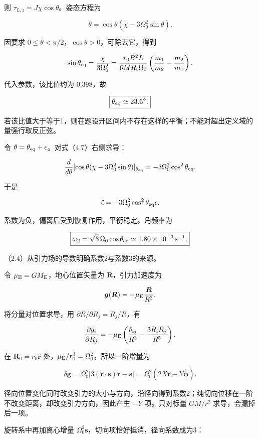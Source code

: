 \documentclass[12pt,a4paper,fontset=fandol]{ctexart}
\begin{document}
则 \(\tau_{L,z}=J\chi\cos\theta\)。姿态方程为

\[
\ddot\theta=\cos\theta(\chi-3\Omega_0^2\sin\theta).
\tag{4.7}
\]

因要求 \(0\le\theta<\pi/2\)，\(\cos\theta>0\)，可除去它，得到

\[
\sin\theta_{\rm eq}=\frac{\chi}{3\Omega_0^2}
=\frac{r_0B^2L}{6MR_{\rm t}\Omega_0}
\left(\frac{m_1}{m_2}-\frac{m_2}{m_1}\right).
\]

代入参数，该比值约为 \(0.398\)，故

\[
\boxed{\theta_{\rm eq}\simeq23.5^\circ.}
\]

若该比值大于等于1，则在题设开区间内不存在这样的平衡；不能对超出定义域的量强行取反正弦。

令 \(\theta=\theta_{\rm eq}+\epsilon\)。对式（4.7）右侧求导：

\[
\frac{d}{d\theta}
[\cos\theta(\chi-3\Omega_0^2\sin\theta)]_{\theta_{\rm eq}}
=-3\Omega_0^2\cos^2\theta_{\rm eq}.
\]

于是

\[
\ddot\epsilon=-3\Omega_0^2\cos^2\theta_{\rm eq}\epsilon.
\]

系数为负，偏离后受到恢复作用，平衡稳定。角频率为

\[
\boxed{\omega_2=\sqrt3\,\Omega_0\cos\theta_{\rm eq}
\simeq1.80\times10^{-3}\,\mathrm{s^{-1}}.}
\]

（2.4）从引力场的导数明确系数2与系数3的来源。

令 \(\mu_{\rm E}=GM_{\rm E}\)，地心位置矢量为
\(\boldsymbol R\)，引力加速度为

\[
\boldsymbol g(\boldsymbol R)=-\mu_{\rm E}\frac{\boldsymbol R}{R^3}.
\]

将分量对位置求导，用 \(\partial R/\partial R_j=R_j/R\)，有

\[
\frac{\partial g_i}{\partial R_j}
=-\mu_{\rm E}\left(\frac{\delta_{ij}}{R^3}
-\frac{3R_iR_j}{R^5}\right).
\]

在 \(\boldsymbol R_0=r_0\hat{\boldsymbol r}\)
处，\(\mu_{\rm E}/r_0^3=\Omega_0^2\)，所以一阶增量为

\[
\delta\boldsymbol g
=\Omega_0^2\big[3(\hat{\boldsymbol r}\cdot\boldsymbol s)
\hat{\boldsymbol r}-\boldsymbol s\big]
=\Omega_0^2(2X\hat{\boldsymbol r}-Y\hat{\boldsymbol\phi}).
\]

径向位置变化同时改变引力的大小与方向，沿径向得到系数2；纯切向位移在一阶不改变距离，却改变引力方向，因此产生
\(-Y\) 项。只对标量 \(GM/r^2\) 求导，会漏掉后一项。

旋转系中再加离心增量
\(\Omega_0^2\boldsymbol s\)，切向项恰好抵消，径向系数成为3：
\end{document}

